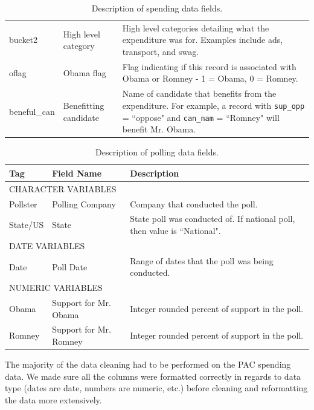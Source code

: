 \documentclass[11pt]{article}\usepackage{graphicx, color}
\begin{document}
\begin{table}[h!]
\begin{tabular}[\textwidth]{l l p{}}
bucket2 & High level category & High level categories detailing what the expenditure was for. Examples include ads, transport, and swag.\\
oflag & Obama flag & Flag indicating if this record is associated with Obama or Romney - 1 = Obama, 0 = Romney.\\
beneful\_can & Benefitting candidate & Name of candidate that benefits from the expenditure. For example, a record with \texttt{sup\_opp} = ``oppose" and \texttt{can\_nam} = ``Romney" will benefit Mr. Obama.\\
\end{tabular}
\caption{Description of spending data fields.}
\label{tab:spendData}
\end{table}

\begin{table}[h!]
\begin{tabular}{l p{} p{}}
Tag & Field Name & Description\\
\hline
\hline
\multicolumn{3}{l}{\MakeTextUppercase{Character Variables}}\\
\hline
Pollster & Polling Company & Company that conducted the poll. \\
State/US & State & State poll was conducted of. If national poll, then value is ``National".\\
\hline
\multicolumn{3}{l}{\MakeTextUppercase{Date Variables}}\\
\hline
Date & Poll Date & Range of dates that the poll was being conducted.\\
\hline
\multicolumn{3}{l}{\MakeTextUppercase{Numeric Variables}}\\
\hline
Obama & Support for Mr. Obama & Integer rounded percent of support in the poll. \\
Romney & Support for Mr. Romney & Integer rounded percent of support in the poll.
\end{tabular}
\caption{Description of polling data fields.}
\label{tab:pollData}
\end{table}

The majority of the data cleaning had to be performed on the PAC spending data. We made sure all the columns were formatted correctly in regards to data type (dates are date, numbers are numeric, etc.) before cleaning and reformatting the data more extensively. 
\end{document}
